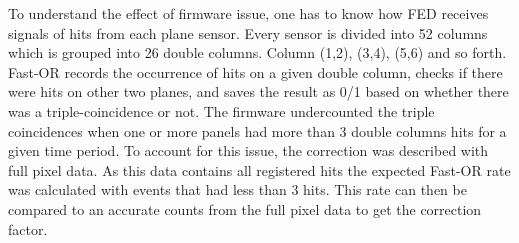 To understand the effect of firmware issue, one has to know how FED receives signals of hits from each plane sensor. Every sensor is divided into 52 columns which is grouped into 26 double columns. Column (1,2), (3,4), (5,6) and so forth. Fast-OR records the occurrence of hits on a given double column, checks if there were hits on other two planes, and saves the result as 0/1 based on whether there was a triple-coincidence or not. The firmware undercounted the triple coincidences when one or more panels had more than 3 double columns hits for a given time period. To account for this issue, the correction was described with full pixel data. As this data contains all registered hits the expected Fast-OR rate was calculated with events that had less than 3 hits. This rate can then be compared to an accurate counts from the full pixel data to get the correction factor.



